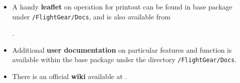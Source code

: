 \begin{itemize}
 \item A handy \textbf{leaflet} on operation for printout can be found in base package under \texttt{/FlightGear/Docs}, and is also available from

.
 
 \item Additional \textbf{user documentation} on particular features and function is available within the
base package under the directory \texttt{/FlightGear/Docs}.
 
 \item There is an official \FlightGear{} \textbf{wiki} available at .
 \end{itemize}

